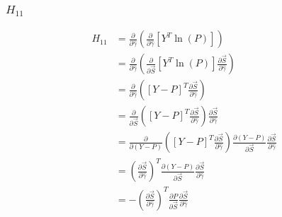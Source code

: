 \documentclass{article}
\begin{document}
\subsubsection{$H_{11}$}
\begin{equation}
\begin{aligned}
H_{11} &= \frac{\partial}{\partial \hat{\gamma}}  \left( \frac{\partial}{\partial \hat{\gamma}}  \left[ Y^T \ln \left( P \right) \right] \right) 
\\
&= \frac{\partial}{\partial \hat{\gamma}}  \left( \frac{\partial}{\partial \vec{S}}  \left[ Y^T \ln \left( P \right) \right] \frac{\partial \vec{S}}{\partial \hat{\gamma}} \right)
\\
&= \frac{\partial}{\partial \hat{\gamma}}  \left( \left[ Y - P \right]^T \frac{\partial \vec{S}}{\partial \hat{\gamma}} \right) 
\\
&= \frac{\partial}{\partial \vec{S}}  \left( \left[ Y - P \right]^T \frac{\partial \vec{S}}{\partial \hat{\gamma}} \right) \frac{\partial \vec{S}}{\partial \hat{\gamma}} 
\\
&= \frac{\partial}{\partial \left( Y - P \right)}  \left( \left[ Y - P \right]^T \frac{\partial \vec{S}}{\partial \hat{\gamma}} \right) \frac{\partial \left( Y - P \right)}{\partial \vec{S}} \frac{\partial \vec{S}}{\partial \hat{\gamma}} 
\\
&= \left( \frac{\partial \vec{S}}{\partial \hat{\gamma}} \right)^T \frac{\partial \left( Y - P \right)}{\partial \vec{S}} \frac{\partial \vec{S}}{\partial \hat{\gamma}} 
\\
&= - \left( \frac{\partial \vec{S}}{\partial \hat{\gamma}} \right)^T \frac{\partial P}{\partial \vec{S}} \frac{\partial \vec{S}}{\partial \hat{\gamma}}
\end{aligned}
\end{equation}
\end{document}
